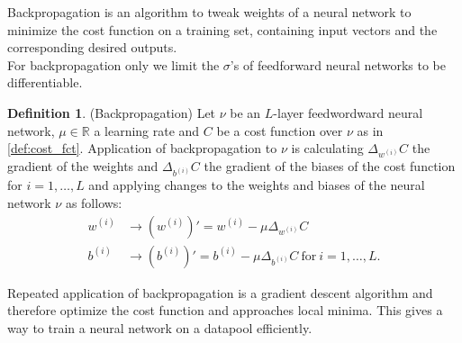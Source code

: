 \documentclass{article}
\theoremstyle{definition}
\newtheorem{definition}[theorem]{Definition}
\begin{document}
Backpropagation is an algorithm to tweak weights of a neural network to minimize the cost function on a training set, containing input vectors and the corresponding desired outputs. \\
For backpropagation only we limit the $\sigma$'s of feedforward neural networks to be differentiable.

\begin{definition}(Backpropagation)
Let $\nu$ be an $L$-layer feedwordward neural network, $\mu \in \mathbb{R}$ a learning rate and $C$ be a cost function over $\nu$ as in \ref{def:cost_fct}. Application of backpropagation to $\nu$ is calculating $\Delta_{w^{(i)}} C$ the gradient of the weights and $\Delta_{b^{(i)}} C$ the gradient of the biases of the cost function for $i = 1, \dots , L$ and applying changes to the weights and biases of the neural network $\nu$ as follows:
\begin{align*}
w^{(i)} &\to (w^{(i)})' = w^{(i)}-\mu \Delta_{w^{(i)}} C \\
b^{(i)} &\to (b^{(i)})' = b^{(i)}-\mu \Delta_{b^{(i)}} C \ \text{for} \ i = 1, \dots, L. 
\end{align*}
\end{definition}

Repeated application of backpropagation is a gradient descent algorithm and therefore optimize the cost function and approaches local minima. This gives a way to train a neural network on a datapool efficiently.
\end{document}
